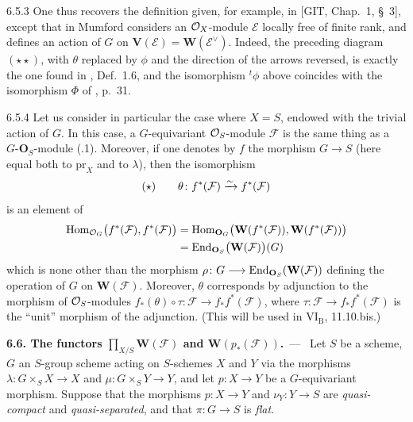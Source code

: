\begin{remark}{6.5.3}
One thus recovers the definition given, for example, in [GIT, Chap.~1,
\S~3], except that in \loccit Mumford considers an \(\mathcal{O}_X\)-module
\(\mathcal{E}\) locally free of finite rank, and defines an action of \(G\)
on \(\mathbf{V}(\mathcal{E})=\mathbf{W}(\mathcal{E}^{\vee})\). Indeed, the
preceding diagram \((\star\star)\), with \(\theta\) replaced by \(\phi\) and
the direction of the arrows reversed, is exactly the one found in \loccit,
Def.~1.6, and the isomorphism \({}^{t}\phi\) above coincides with the
isomorphism \(\Phi\) of \loccit, p.~31.
\end{remark}

\begin{remark}{6.5.4}\label{I.6.5.4}
Let us consider in particular the case where \(X=S\), endowed with the
trivial action of \(G\). In this case, a \(G\)-equivariant \(\mathcal{O}_S\)-module
\(\mathcal{F}\) is the same thing as a \(G\text{-}\mathbf{O}_{S}\)-module
(.1). Moreover, if one denotes by \(f\) the morphism \(G\to S\) (here
equal both to \(\mathrm{pr}_{X}\) and to \(\lambda\)), then the isomorphism
\begin{equation*}
(\star)\qquad
\theta\colon f^{*}(\mathcal{F})\xrightarrow{\sim} f^{*}(\mathcal{F})
\end{equation*}
is an element of
\begin{align*}
\operatorname{Hom}_{\mathcal{O}_{G}}\bigl(f^{*}(\mathcal{F}),f^{*}(\mathcal{F})\bigr)
  &=\operatorname{Hom}_{\mathbf{O}_{G}}\bigl(\mathbf{W}(f^{*}(\mathcal{F})),
      \mathbf{W}(f^{*}(\mathcal{F}))\bigr) \\
  &=\operatorname{End}_{\mathbf{O}_{S}}\bigl(\mathbf{W}(\mathcal{F})\bigr)(G)
\end{align*}
which is none other than the morphism
\(\rho\colon G\longrightarrow\operatorname{End}_{\mathbf{O}_{S}}(\mathbf{W}(\mathcal{F}))\) defining the
operation of \(G\) on \(\mathbf{W}(\mathcal{F})\). Moreover, \(\theta\)
corresponds by adjunction to the morphism of \(\mathcal{O}_S\)-modules
\(f_{*}(\theta)\circ\tau\colon\mathcal{F}\to f_{*}f^{*}(\mathcal{F})\), where
\(\tau\colon\mathcal{F}\to f_{*}f^{*}(\mathcal{F})\) is the ``unit'' morphism
of the adjunction. (This will be used in
\(\mathrm{VI}_{\mathrm{B}}\), 11.10.bis.)
\end{remark}

\par{}
\noindent\textbf{6.6. The functors \(\prod_{X/S}\mathbf{W}(\mathcal{F})\) and
\(\mathbf{W}(p_{*}(\mathcal{F}))\).}\ ---\ \label{I.sec.6.6}
Let \(S\) be a scheme, \(G\) an \(S\)-group scheme acting on \(S\)-schemes \(X\)
and \(Y\) via the morphisms \(\lambda\colon G\times_{S}X\to X\) and
\(\mu\colon G\times_{S}Y\to Y\), and let \(p\colon X\to Y\) be a
\(G\)-equivariant morphism. Suppose that the morphisms \(p\colon X\to Y\) and
\(\nu_{Y}\colon Y\to S\) are \emph{quasi-compact} and \emph{quasi-separated},
and that \(\pi\colon G\to S\) is \emph{flat}.

